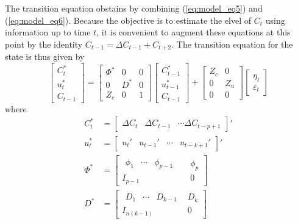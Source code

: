 The transition equation obstains by combining (\ref{eq:model_eq5}) and (\ref{eq:model_eq6}). Because the objective is to estimate the elvel of $C_t$ using information up to time $t$, it is convenient to augment these equations at this point by the identity $C_{t-1} = \Delta C_{t-1} + C_{t+2}$. The transition equation for the state is thus given by
\begin{equation}\label{eq:transition_eq}
	\begin{bmatrix}
		C_t^\ast \\ u_t^\ast \\ C_{t-1}
	\end{bmatrix}
	=
	\begin{bmatrix}
		\Phi^\ast & 0 & 0 \\ 0 & D^\ast & 0 \\ Z_c & 0 & 1
	\end{bmatrix}
	\begin{bmatrix}
		C_{t-1}^\ast \\ u_{t-1}^\ast \\ C_{t-1}
	\end{bmatrix}
	+ 
	\begin{bmatrix}
		Z_c & 0 \\ 0 & Z_u \\ 0 & 0
	\end{bmatrix}
	\begin{bmatrix}
		\eta_t \\ \varepsilon_t
	\end{bmatrix}
\end{equation}
where 
\begin{equation}
	\begin{aligned}
		C_{t}^\ast &= 
		\begin{bmatrix}
			\Delta C_t &	\Delta C_{t-1} &\cdots \Delta C_{t-p+1}
		\end{bmatrix}'
	\\
		u_t^\ast &= 
		\begin{bmatrix}
		u_t' & u_{t-1}' & \cdots & u_{t-k+1}'
		\end{bmatrix}'
	\\
		\Phi^\ast &=
		\begin{bmatrix}
			\begin{matrix}
			\phi_1 & \cdots  &\phi_{p-1} &
			\end{matrix} & \phi_p\\
			I_{p-1} & 0 
		\end{bmatrix}
	\\
		D^\ast &=
		\begin{bmatrix}
			\begin{matrix}
				D_1  & \cdots & D_{k-1} 
			\end{matrix}& D_k\\
		I_{n(k-1)} & 0 
		\end{bmatrix}
\end{aligned}
\end{equation}
